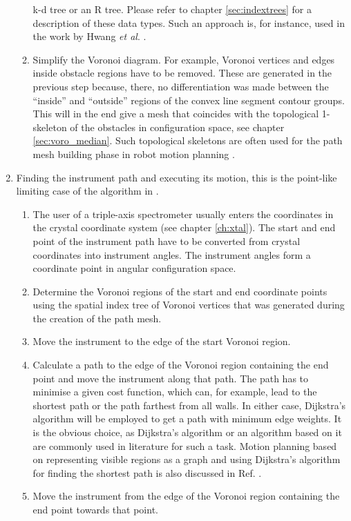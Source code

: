 \begin{enumerate}
\begin{enumerate}
			k-d tree or an R tree.
			Please refer to chapter \ref{sec:indextrees} for a description of these data types.
			Such an approach is, for instance, used in the work by 
			Hwang \textit{et al}. \cite{Hwang2003}.
		\item Simplify the Voronoi diagram. For example, Voronoi vertices and 
			edges inside obstacle regions have to be removed.
			These are generated in the previous step because, there, no 
			differentiation was made between the ``inside'' and ``outside'' 
			regions of the convex line segment contour groups.
			This will in the end give a mesh that coincides with the
			topological 1-skeleton of the obstacles in configuration space, 
			see chapter \ref{sec:voro_median}.
			Such topological skeletons are often used for the path mesh building 
			phase in robot motion planning \cite{Choset2010_ch5}.
	\end{enumerate}

	\item Finding the instrument path and executing its motion, this is the 
		point-like limiting case of the algorithm in \cite[p. 163]{Berg2008}.
	\begin{enumerate}
		\item The user of a triple-axis spectrometer usually enters the coordinates 
			in the crystal coordinate system (see chapter \ref{ch:xtal}). The start 
			and end point of the instrument path have to be converted from crystal
			coordinates into instrument angles. The instrument angles form a 
			coordinate point in angular configuration space.
		\item Determine the Voronoi regions of the start and end coordinate points
			using the spatial index tree of Voronoi vertices that was generated 
			during the creation of the path mesh.
		\item Move the instrument to the edge of the start Voronoi region.
		\item Calculate a path to the edge of the Voronoi region 
			containing the end point and move the instrument along that path. 
			The path has to minimise a given cost function, which can,
			for example, lead to the shortest path or the path farthest from
			all walls. 
			In either case, Dijkstra's algorithm \cite{wiki_dijkstra}
			will be employed to get a path with minimum edge weights.
			It is the obvious choice, as Dijkstra's algorithm or an algorithm based 
			on it are commonly used in literature \cite{Hwang2003, Singal2014} 
			for such a task. Motion planning based on representing visible regions
			as a graph and using Dijkstra's algorithm for finding the shortest path
			is also discussed in Ref. \cite[Ch. 7, p. 313]{FUH_geo2020}.
		\item Move the instrument from the edge of the Voronoi region containing 
			the end point towards that point.
	\end{enumerate}
\end{enumerate}


